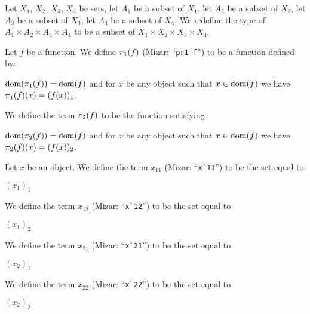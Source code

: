 \documentclass{article}
\begin{document}
\begin{definition}
Let $X_{1}$, $X_{2}$, $X_{3}$, $X_{4}$ be sets,
let $A_{1}$ be a subset of $X_{1}$, let
$A_{2}$ be a subset of $X_{2}$, let $A_{3}$ be a subset of $X_{3}$,
let $A_{4}$ be a subset of $X_{4}$.
We redefine the type of $A_{1}\times A_{2}\times A_{3}\times A_{4}$
to be a subset of $X_{1}\times X_{2}\times X_{3}\times X_{4}$.
\end{definition}

\begin{definition}
Let $f$ be a function. We define $\pi_{1}(f)$ (Mizar: ``\verb#pr1 f#'')
to be a function defined by:
\begin{defn}
\item $\operatorname{dom}(\pi_{1}(f))=\operatorname{dom}(f)$ and for $x$ be any object such that $x\in\operatorname{dom}(f)$
we have $\pi_{1}(f)(x)=(f(x))_{1}$.
\end{defn}
We define the term $\pi_{2}(f)$ to be the function satisfying
\begin{defn}
\item $\operatorname{dom}(\pi_{2}(f))=\operatorname{dom}(f)$ and for $x$ be any object such that $x\in\operatorname{dom}(f)$
we have $\pi_{2}(f)(x)=(f(x))_{2}$.
\end{defn}
\end{definition}

\begin{definition}
Let $x$ be an object.
We define the term $x_{11}$ (Mizar: ``\verb#x`11#'') to be the set equal
to
\begin{defn}
\item $(x_{1})_{1}$
\end{defn}
We define the term $x_{12}$ (Mizar: ``\verb#x`12#'') to be the set equal
to
\begin{defn}
\item $(x_{1})_{2}$
\end{defn}
We define the term $x_{21}$ (Mizar: ``\verb#x`21#'') to be the set equal
to
\begin{defn}
\item $(x_{2})_{1}$
\end{defn}
We define the term $x_{22}$ (Mizar: ``\verb#x`22#'') to be the set equal
to
\begin{defn}
\item $(x_{2})_{2}$
\end{defn}
\end{definition}
\end{document}
